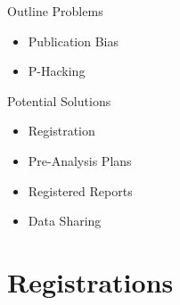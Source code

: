 \documentclass{beamer}
\begin{document}
\begin{frame}{Outline}
Problems
\begin{itemize}
\item Publication Bias 
\item P-Hacking
\end{itemize}
Potential Solutions
\begin{itemize}
\item Registration
\item Pre-Analysis Plans
\item Registered Reports
\item Data Sharing
\end{itemize}
\end{frame}

%
\section{Registrations}
\end{document}
